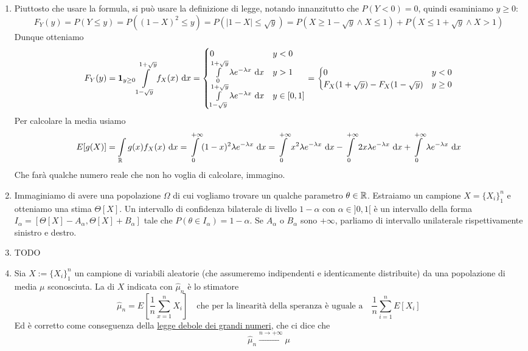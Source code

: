 \documentclass{article}
\begin{document}
\begin{enumerate}
    \item Piuttosto che usare la formula, si può usare la definizione di legge, notando innanzitutto che $P(Y < 0) = 0$, quindi esaminiamo $y\ge 0$:
    \[ F_Y(y) = P(Y\le y) = P((1-X)^2 \le y) = P(|1-X|\le \sqrt{y}) = P(X \ge 1-\sqrt{y} \wedge X \le 1) + P(X \le 1+\sqrt{y} \wedge X > 1)\]
    Dunque otteniamo
    \[F_Y(y) = \mathbf{1}_{y\ge 0} \int\limits_{1-\sqrt{y}}^{1+\sqrt{y}} f_X(x)\text{ d} x = \begin{cases}
        0 & y < 0\\
        \int\limits_{0}^{1+\sqrt{y}} \lambda e^{-\lambda x}\text{ d} x & y > 1\\
        \int\limits_{1-\sqrt{y}}^{1+\sqrt{y}}\lambda e^{-\lambda x}\text{ d} x & y \in [0,1]
    \end{cases} = \begin{cases}
        0 & y < 0\\
        F_X(1+\sqrt{y}) - F_X(1-\sqrt{y}) & y \ge 0
    \end{cases} \]
    Per calcolare la media usiamo
    \[E[g(X)] = \int\limits_{\mathbb{R}} g(x) f_X(x)\text{ d} x = \int\limits_0^{+\infty} (1-x)^2 \lambda e^{-\lambda x}\text{ d} x = \int\limits_0^{+\infty} x^2 \lambda e^{-\lambda x}\text{ d} x - \int\limits_0^{+\infty} 2x \lambda e^{-\lambda x}\text{ d} x + \int\limits_0^{+\infty} \lambda e^{-\lambda x}\text{ d} x\]
    Che farà qualche numero reale che non ho voglia di calcolare, immagino.
    \item Immaginiamo di avere una popolazione $\Omega$ di cui vogliamo trovare un qualche parametro $\theta\in\mathbb{R}$. Estraiamo un campione $X=\{X_i\}_1^n$ e otteniamo una stima $\Theta[X]$. Un intervallo di confidenza bilaterale di livello $1-\alpha$ con $\alpha \in ]0,1[$ è un intervallo della forma $I_\alpha = [\Theta[X]-A_\alpha, \Theta[X] + B_\alpha]$ tale che $P(\theta \in I_\alpha) = 1-\alpha$. Se $A_\alpha$ o $B_\alpha$ sono $+\infty$, parliamo di intervallo unilaterale rispettivamente sinistro e destro.
    \item TODO
    \item Sia $X := \{X_i\}_1^n$ un campione di variabili aleatorie (che assumeremo indipendenti e identicamente distribuite) da una popolazione di media $\mu$ sconosciuta. La  di $X$ indicata con $\hat{\mu}_n$ è lo stimatore
    \[\hat{\mu}_n = E\left[\frac{1}{n}\sum_{x=1}^n X_i\right] \quad \text{che per la linearità della speranza è uguale a}\quad \frac{1}{n}\sum_{i=1}^n E[X_i]\]
    Ed è corretto come conseguenza della \href{th:WLLN}{legge debole dei grandi numeri}, che ci dice che 
    \[\hat{\mu}_n \xrightarrow{n\to +\infty} \mu\]
\end{enumerate}
\end{document}
